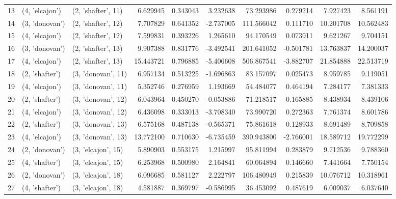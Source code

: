 \begin{tabular}{lllrrrrrrr}
13 &   (4, 'elcajon') &  (2, 'shafter', 11) &   6.629945 &   0.343043 &   3.232638 &    73.293986 &   0.279214 &   7.927423 &   8.561191 \\
14 &   (3, 'donovan') &  (2, 'shafter', 12) &   7.707829 &   0.641352 &  -2.737005 &   111.566042 &   0.111710 &  10.201708 &  10.562483 \\
15 &   (4, 'elcajon') &  (2, 'shafter', 12) &   7.599831 &   0.393226 &   1.265610 &    94.170549 &   0.073911 &   9.621267 &   9.704151 \\
16 &   (3, 'donovan') &  (2, 'shafter', 13) &   9.907388 &   0.831776 &  -3.492541 &   201.641052 &  -0.501781 &  13.763837 &  14.200037 \\
17 &   (4, 'elcajon') &  (2, 'shafter', 13) &  15.443721 &   0.796885 &  -5.406608 &   506.867541 &  -3.882707 &  21.854888 &  22.513719 \\
18 &   (2, 'shafter') &  (3, 'donovan', 11) &   6.957134 &   0.513225 &  -1.696863 &    83.157097 &   0.025473 &   8.959785 &   9.119051 \\
19 &   (4, 'elcajon') &  (3, 'donovan', 11) &   5.352746 &   0.276959 &   1.193669 &    54.484077 &   0.464194 &   7.284177 &   7.381333 \\
20 &   (2, 'shafter') &  (3, 'donovan', 12) &   6.043964 &   0.450270 &  -0.053886 &    71.218517 &   0.165885 &   8.438934 &   8.439106 \\
21 &   (4, 'elcajon') &  (3, 'donovan', 12) &   6.436098 &   0.333013 &  -3.708340 &    73.990720 &   0.272363 &   7.761374 &   8.601786 \\
22 &   (2, 'shafter') &  (3, 'donovan', 13) &   6.575168 &   0.487138 &  -0.565371 &    75.861618 &   0.128933 &   8.691489 &   8.709858 \\
23 &   (4, 'elcajon') &  (3, 'donovan', 13) &  13.772100 &   0.710630 &  -6.735459 &   390.943800 &  -2.766001 &  18.589712 &  19.772299 \\
24 &   (2, 'donovan') &  (3, 'elcajon', 15) &   5.890903 &   0.553175 &   1.215997 &    95.811994 &   0.283879 &   9.712536 &   9.788360 \\
25 &   (4, 'shafter') &  (3, 'elcajon', 15) &   6.253968 &   0.500980 &   2.164841 &    60.064894 &   0.146660 &   7.441664 &   7.750154 \\
26 &   (2, 'donovan') &  (3, 'elcajon', 18) &   6.096685 &   0.581127 &   2.222797 &   106.480949 &   0.215839 &  10.076712 &  10.318961 \\
27 &   (4, 'shafter') &  (3, 'elcajon', 18) &   4.581887 &   0.369797 &  -0.586995 &    36.453092 &   0.487619 &   6.009037 &   6.037640 \\

\end{tabular}
